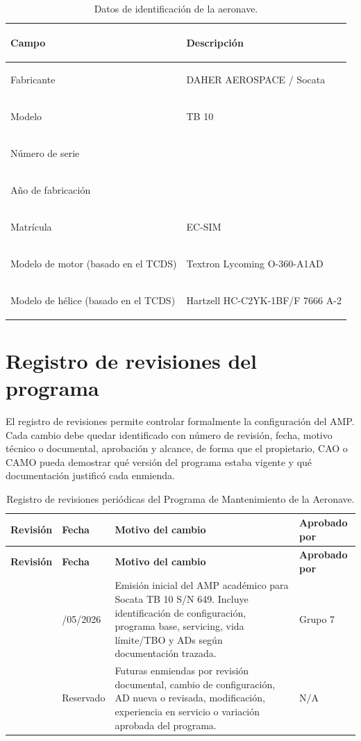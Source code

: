\documentclass[12pt]{article}
\begin{document}
\begin{table}[H]
\centering
\caption{Datos de identificación de la aeronave.}
\label{tab:identificacion-aeronave}
\renewcommand{\arraystretch}{1.25}
\begin{tabularx}{\textwidth}{|>{\bfseries\raggedright\arraybackslash}p{}|>{\raggedright\arraybackslash}X|}
\hline
Campo & Descripción \\
\hline
Fabricante & DAHER AEROSPACE / Socata \\
\hline
Modelo & TB 10 \\
\hline
Número de serie & 649 \\
\hline
Año de fabricación & 1988 \\
\hline
Matrícula & EC-SIM \\
\hline
Modelo de motor (basado en el TCDS) & Textron Lycoming O-360-A1AD \\
\hline
Modelo de hélice (basado en el TCDS) & Hartzell HC-C2YK-1BF/F 7666 A-2 \\
\hline
\end{tabularx}
\end{table}

\section{Registro de revisiones del programa}
\label{sec:registro-revisiones}

El registro de revisiones permite controlar formalmente la configuración del AMP. Cada cambio debe quedar identificado con número de revisión, fecha, motivo técnico o documental, aprobación y alcance, de forma que el propietario, CAO o CAMO pueda demostrar qué versión del programa estaba vigente y qué documentación justificó cada enmienda.

\begingroup
\small
\setlength{\tabcolsep}{4pt}
\renewcommand{\arraystretch}{1.18}
\begin{longtable}{|>{\raggedright\arraybackslash}p{}|>{\raggedright\arraybackslash}p{}|>{\raggedright\arraybackslash}p{}|>{\raggedright\arraybackslash}p{}|}
\caption{Registro de revisiones periódicas del Programa de Mantenimiento de la Aeronave.}
\label{tab:registro-revisiones}\\
\hline
\textbf{Revisión} & \textbf{Fecha} & \textbf{Motivo del cambio} & \textbf{Aprobado por} \\
\hline
\endfirsthead
\hline
\textbf{Revisión} & \textbf{Fecha} & \textbf{Motivo del cambio} & \textbf{Aprobado por} \\
\hline
\endhead
0 & 10/05/2026 & Emisión inicial del AMP académico para Socata TB 10 S/N 649. Incluye identificación de configuración, programa base, servicing, vida límite/TBO y ADs según documentación trazada. & Grupo 7 \\
\hline
1 & Reservado & Futuras enmiendas por revisión documental, cambio de configuración, AD nueva o revisada, modificación, experiencia en servicio o variación aprobada del programa. & N/A \\
\hline
\end{longtable}
\endgroup
\end{document}

